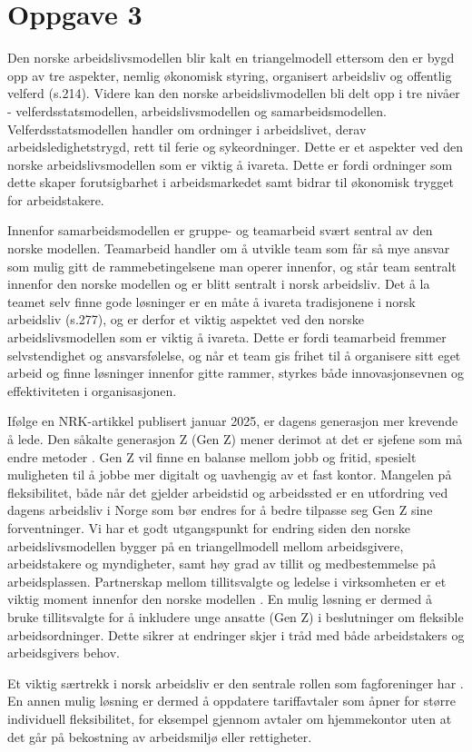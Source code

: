 \section{Oppgave 3}
Den norske arbeidslivsmodellen blir kalt en triangelmodell ettersom den er bygd opp av tre aspekter, nemlig økonomisk styring, organisert arbeidsliv og offentlig velferd \parencite{Teknologiledelse} (s.214). 
Videre kan den norske arbeidslivmodellen bli delt opp i tre nivåer - velferdsstatsmodellen, arbeidslivsmodellen og samarbeidsmodellen. 
Velferdsstatsmodellen handler om ordninger i arbeidslivet, derav arbeidsledighetstrygd, rett til ferie og sykeordninger. 
Dette er et aspekter ved den norske arbeidslivsmodellen som er viktig å ivareta. Dette er fordi ordninger som dette skaper forutsigbarhet i arbeidsmarkedet samt bidrar til økonomisk trygget for arbeidstakere.
 
Innenfor samarbeidsmodellen er gruppe- og teamarbeid svært sentral av den norske modellen. 
Teamarbeid handler om å utvikle team som får så mye ansvar som mulig gitt de rammebetingelsene man operer innenfor, og står team sentralt innenfor den norske modellen og er blitt sentralt i norsk arbeidsliv. 
Det å la teamet selv finne gode løsninger er en måte å ivareta tradisjonene i norsk arbeidsliv \parencite{Teknologiledelse} (s.277), og er derfor et viktig aspektet ved den norske arbeidslivsmodellen som er viktig å ivareta. 
Dette er fordi teamarbeid fremmer selvstendighet og ansvarsfølelse, og når et team gis frihet til å organisere sitt eget arbeid og finne løsninger innenfor gitte rammer, styrkes både innovasjonsevnen og effektiviteten i organisasjonen.
 
Ifølge en NRK-artikkel publisert januar 2025, er dagens generasjon mer krevende å lede. Den såkalte generasjon Z (Gen Z) mener derimot at det er sjefene som må endre metoder \parencite{NRK}. Gen Z vil finne en balanse mellom jobb og fritid, spesielt muligheten til å jobbe mer digitalt og uavhengig av et fast kontor.  Mangelen på fleksibilitet, både når det gjelder arbeidstid og arbeidssted er en utfordring ved dagens arbeidsliv i Norge som bør endres for å bedre tilpasse seg Gen Z sine forventninger. Vi har et godt utgangspunkt for endring siden den norske arbeidslivsmodellen bygger på en triangellmodell mellom arbeidsgivere, arbeidstakere og myndigheter, samt høy grad av tillit og medbestemmelse på arbeidsplassen. Partnerskap mellom tillitsvalgte og ledelse i virksomheten er et viktig moment innenfor den norske modellen \parencite[229]{Teknologiledelse}. 
En mulig løsning er dermed å bruke tillitsvalgte for å inkludere unge ansatte (Gen Z) i beslutninger om fleksible arbeidsordninger. Dette sikrer at endringer skjer i tråd med både arbeidstakers og arbeidsgivers behov.
 
 
Et viktig særtrekk i norsk arbeidsliv er den sentrale rollen som fagforeninger har \parencite[214]{Teknologiledelse}. En annen mulig løsning er dermed å oppdatere tariffavtaler som åpner for større individuell fleksibilitet, for eksempel gjennom avtaler om hjemmekontor uten at det går på bekostning av arbeidsmiljø eller rettigheter. 